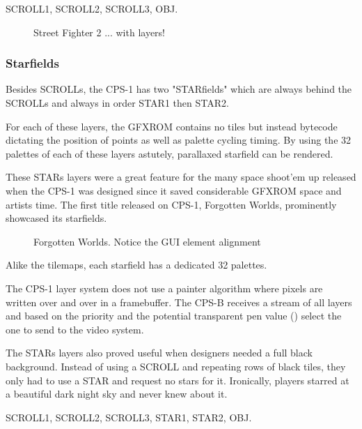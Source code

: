  SCROLL1,  SCROLL2,  SCROLL3,  OBJ.

\vfill
\begin{figure}[!b]
 \caption*{Street Fighter 2 ... with layers!}%
 \end{figure}%
\pagebreak


\subsubsection{Starfields}
Besides SCROLLs, the CPS-1 has two "STARfields" which are always behind the SCROLLs and always in order STAR1 then STAR2. 

For each of these layers, the GFXROM contains no tiles but instead bytecode dictating the position of points as well as palette cycling timing. By using the 32 palettes of each of these layers astutely, parallaxed starfield can be rendered. 

These STARs layers were a great feature for the many space shoot'em up released when the CPS-1 was designed since it saved considerable GFXROM space and artists time. The first title released on CPS-1, Forgotten Worlds, prominently showcased its starfields.

\vfill
\begin{figure}[!b]
 \caption*{Forgotten Worlds. Notice the GUI element alignment}%
 \end{figure}%
\pagebreak

Alike the tilemaps, each starfield has a dedicated 32 palettes.

\begin{trivia}
The CPS-1 layer system does not use a painter algorithm where pixels are written over and over in a framebuffer. The CPS-B receives a stream of all layers and based on the priority and the potential transparent pen value () select the one to send to the video system.
\end{trivia}

The STARs layers also proved useful when designers needed a full black background. Instead of using a SCROLL and repeating rows of black tiles, they only had to use a STAR and request no stars for it. Ironically, players starred at a beautiful dark night sky and never knew about it.

 SCROLL1,  SCROLL2,  SCROLL3,  STAR1,  STAR2,  OBJ.

